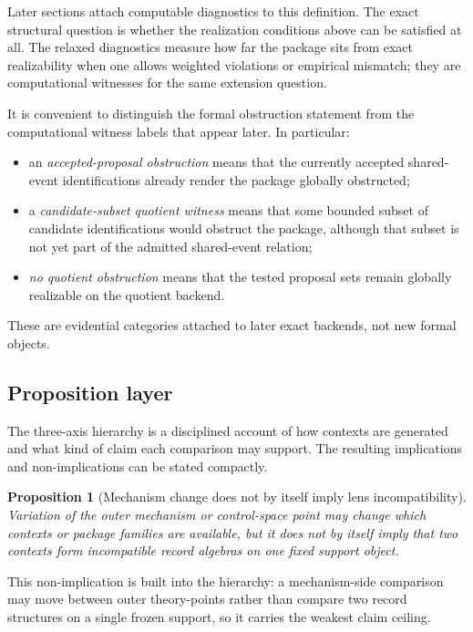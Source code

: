 \documentclass[11pt]{article}
\newtheorem{proposition}[theorem]{Proposition}
\theoremstyle{definition}
\begin{document}
Later sections attach computable diagnostics to this definition. The exact structural question is whether the realization conditions above can be satisfied at all. The relaxed diagnostics measure how far the package sits from exact realizability when one allows weighted violations or empirical mismatch; they are computational witnesses for the same extension question.

It is convenient to distinguish the formal obstruction statement from the computational witness labels that appear later. In particular:
\begin{itemize}
    \item an \emph{accepted-proposal obstruction} means that the currently accepted shared-event identifications already render the package globally obstructed;
    \item a \emph{candidate-subset quotient witness} means that some bounded subset of candidate identifications would obstruct the package, although that subset is not yet part of the admitted shared-event relation;
    \item \emph{no quotient obstruction} means that the tested proposal sets remain globally realizable on the quotient backend.
\end{itemize}
These are evidential categories attached to later exact backends, not new formal objects.

\subsection{Proposition layer}

The three-axis hierarchy is a disciplined account of how contexts are generated and what kind of claim each comparison may support. The resulting implications and non-implications can be stated compactly.

\begin{proposition}[Mechanism change does not by itself imply lens incompatibility]\label{prop:mechanism-nonimplication}
Variation of the outer mechanism or control-space point may change which contexts or package families are available, but it does not by itself imply that two contexts form incompatible record algebras on one fixed support object.
\end{proposition}

\noindent This non-implication is built into the hierarchy: a mechanism-side comparison may move between outer theory-points rather than compare two record structures on a single frozen support, so it carries the weakest claim ceiling.
\end{document}
